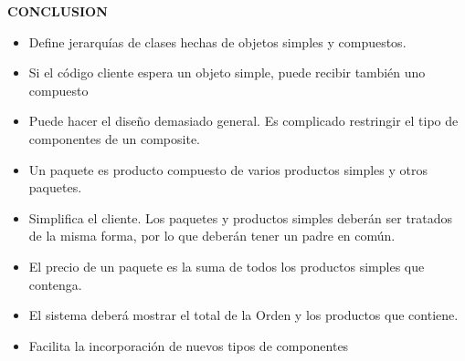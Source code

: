 \begin{flushleft}
\textbf{CONCLUSION}

\begin{itemize}
\item Define jerarquías de clases hechas de objetos simples y compuestos. 
\item Si el código cliente espera un objeto simple, puede recibir también uno compuesto 
\item Puede hacer el diseño demasiado general. Es complicado restringir el tipo de componentes de un composite.
\item Un paquete es producto compuesto de varios productos simples y otros paquetes.
\item Simplifica el cliente.  Los paquetes y productos simples deberán ser tratados de la misma forma, por lo que deberán tener un padre en común.
\item El precio de un paquete es la suma de todos los productos simples que contenga.
\item El sistema deberá mostrar el total de la Orden y los productos que contiene.
\item Facilita la incorporación de nuevos tipos de componentes


\end{itemize} 





\end{flushleft}